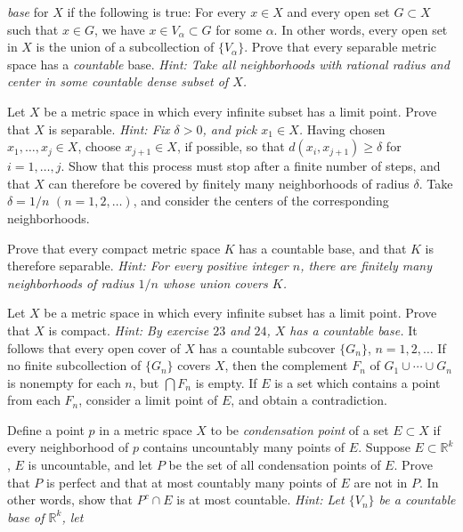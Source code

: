 \begin{exercise}
  \textit{base} for \(X\) if the following is true: For every \(x\in X\) and
  every open set \(G\subset X\) such that \(x\in G\), we have
  \(x\in V_{\alpha}\subset G\) for some \(\alpha\).
  In other words, every open set in \(X\) is the union of a subcollection of
  \(\{V_{\alpha}\}\).
  Prove that every separable metric space has a \textit{countable} base.
  \textit{Hint: Take all neighborhoods with rational radius and center in some
    countable dense subset of \(X\).}
\item
  Let \(X\) be a metric space in which every infinite subset has a limit point.
  Prove that \(X\) is separable.
  \textit{Hint: Fix \(\delta > 0\), and pick \(x_1\in X\).}
  Having chosen \(x_1,\ldots,x_j\in X\), choose \(x_{j + 1}\in X\), if
  possible, so that \(d(x_i, x_{j + 1})\geq\delta\) for \(i = 1,\ldots,j\).
  Show that this process must stop after a finite number of steps, and that
  \(X\) can therefore be covered by finitely many neighborhoods of radius
  \(\delta\).
  Take \(\delta = 1/n\) \((n = 1,2,\ldots)\), and consider the centers of the
  corresponding neighborhoods.
\item
  Prove that every compact metric space \(K\) has a countable base, and that
  \(K\) is therefore separable.
  \textit{Hint: For every positive integer \(n\), there are finitely many
    neighborhoods of radius \(1/n\) whose union covers \(K\).}
\item
  Let \(X\) be a metric space in which every infinite subset has a limit point.
  Prove that \(X\) is compact.
  \textit{Hint: By exercise \(23\) and \(24\), \(X\) has a countable base.}
  It follows that every open cover of \(X\) has a countable subcover
  \(\{G_n\}\), \(n = 1,2,\ldots\)
  If no finite subcollection of \(\{G_n\}\) covers \(X\), then the complement
  \(F_n\) of \(G_1\cup\cdots\cup G_n\) is nonempty for each \(n\), but
  \(\bigcap F_n\) is empty.
  If \(E\) is a set which contains a point from each \(F_n\), consider a limit
  point of \(E\), and obtain a contradiction.
\item
  Define a point \(p\) in a metric space \(X\) to be
  \textit{condensation point} of a set \(E\subset X\) if every neighborhood of
  \(p\) contains uncountably many points of \(E\).
  Suppose \(E\subset\mathbb{R}^k\), \(E\) is uncountable, and let \(P\) be the
  set of all condensation points of \(E\).
  Prove that \(P\) is perfect and that at most countably many points of \(E\)
  are not in \(P\).
  In other words, show that \(P^c\cap E\) is at most countable.
  \textit{Hint: Let \(\{V_n\}\) be a countable base of \(\mathbb{R}^k\), let
}
\end{exercise}
